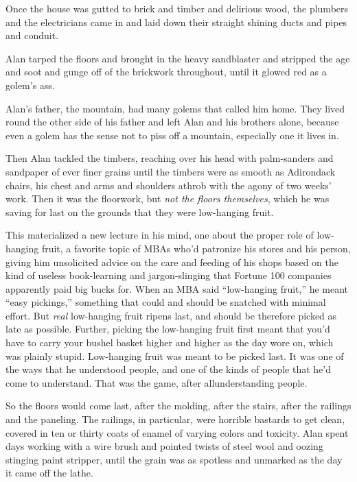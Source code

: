 Once the house was gutted to brick and timber and delirious wood, the
plumbers and the electricians came in and laid down their straight
shining ducts and pipes and conduit.

Alan tarped the floors and brought in the heavy sandblaster and
stripped the age and soot and gunge off of the brickwork throughout,
until it glowed red as a golem's ass.

Alan's father, the mountain, had many golems that called him home. 
They lived round the other side of his father and left Alan and his
brothers alone, because even a golem has the sense not to piss off a
mountain, especially one it lives in.

Then Alan tackled the timbers, reaching over his head with
palm-sanders and sandpaper of ever finer grains until the timbers were
as smooth as Adirondack chairs, his chest and arms and shoulders
athrob with the agony of two weeks' work.  Then it was the floorwork,
but \textit{not the floors themselves}, which he was saving for last
on the grounds that they were low-hanging fruit.

This materialized a new lecture in his mind, one about the proper role
of low-hanging fruit, a favorite topic of MBAs who'd patronize his
stores and his person, giving him unsolicited advice on the care and
feeding of his shops based on the kind of useless book-learning and
jargon-slinging that Fortune 100 companies apparently paid big bucks
for.  When an MBA said ``low-hanging fruit,'' he meant ``easy
pickings,'' something that could and should be snatched with minimal
effort.  But \textit{real} low-hanging fruit ripens last, and should
be therefore picked as late as possible.  Further, picking the
low-hanging fruit first meant that you'd have to carry your bushel
basket higher and higher as the day wore on, which was plainly stupid. 
Low-hanging fruit was meant to be picked last.  It was one of the ways
that he understood people, and one of the kinds of people that he'd
come to understand.  That was the game, after all\dash{}understanding
people.

So the floors would come last, after the molding, after the stairs,
after the railings and the paneling.  The railings, in particular,
were horrible bastards to get clean, covered in ten or thirty coats of
enamel of varying colors and toxicity.  Alan spent days working with a
wire brush and pointed twists of steel wool and oozing stinging paint
stripper, until the grain was as spotless and unmarked as the day it
came off the lathe.

